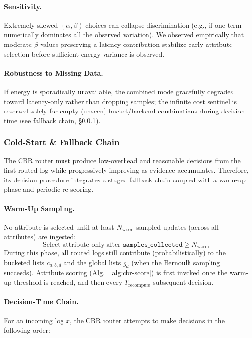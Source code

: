 \paragraph{Sensitivity.}
Extremely skewed $(\alpha,\beta)$ choices can collapse discrimination (e.g., if one term numerically dominates all the observed variation). We observed empirically that moderate $\beta$ values preserving a latency contribution stabilize early attribute selection before sufficient energy variance is observed.

\paragraph{Robustness to Missing Data.}
If energy is sporadically unavailable, the combined mode gracefully degrades toward latency-only rather than dropping samples; the infinite cost sentinel is reserved solely for empty (unseen) bucket/backend combinations during decision time (see fallback chain, \S\ref{subsubsec:cbr-fallback}).

\subsubsection{Cold-Start \& Fallback Chain}
\label{subsubsec:cbr-fallback}

The CBR router must produce low-overhead and reasonable decisions from the first routed log while progressively improving as evidence accumulates. Therefore, its decision procedure integrates a staged fallback chain coupled with a warm-up phase and periodic re-scoring.

\paragraph{Warm-Up Sampling.}
No attribute is selected until at least $N_{\text{warm}}$ sampled updates (across all attributes) are ingested:
\[
\text{Select attribute only after } \texttt{samples\_collected} \ge N_{\text{warm}}.
\]
During this phase, all routed logs still contribute (probabilistically) to the bucketed lists $c_{a,b,d}$ and the global lists $g_d$ (when the Bernoulli sampling succeeds). Attribute scoring (Alg. ~\ref{alg:cbr-score}) is first invoked once the warm-up threshold is reached, and then every $T_{\text{recompute}}$ subsequent decision.

\paragraph{Decision-Time Chain.}
For an incoming log $x$, the CBR router attempts to make decisions in the following order:


